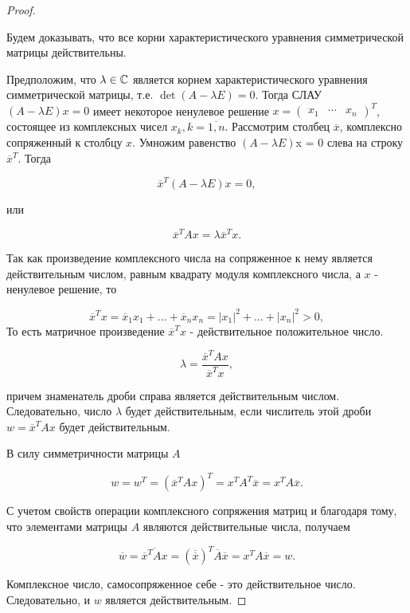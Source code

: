 \begin{proof}~

    Будем доказывать, что все корни характеристического уравнения симметрической матрицы действительны.

    Предположим, что $\lambda \in \mathbb{C}$ является корнем характеристического уравнения симметрической матрицы, т.е. $\det (A - \lambda E) = 0$. Тогда СЛАУ $(A - \lambda E)x = 0$ имеет некоторое ненулевое решение $x = \begin{pmatrix} x_1 & \cdots & x_n \end{pmatrix} ^ T$, состоящее из комплексных чисел $x_k, k = \overline{1, n}$. Рассмотрим столбец $\overline{x}$, комплексно сопряженный к столбцу $x$. Умножим равенство $(A - \lambda E)$x = 0 слева на строку $\overline{x}^T$. Тогда

    $$\overline{x}^T(A - \lambda E)x = 0,$$

    или

    $$\overline{x}^TAx = \lambda \overline{x}^Tx.$$

    Так как произведение комплексного числа на сопряженное к нему является действительным числом, равным квадрату модуля комплексного числа, а $x$ - ненулевое решение, то
    
    $$\overline{x}^Tx = \overline{x}_1x_1 + \ldots + \overline{x}_nx_n = |x_1|^2 + \ldots + |x_n|^2 > 0,$$
    То есть матричное произведение $\overline{x}^Tx$ - действительное положительное число.

    $$\lambda = \frac{\overline{x}^TAx}{\overline{x}^Tx},$$

    причем знаменатель дроби справа является действительным числом. Следовательно, число $\lambda$ будет действительным, если числитель этой дроби $w = \overline{x}^TAx$ будет действительным.

    В силу симметричности матрицы $A$

    $$w = w^T = (\overline{x}^TAx)^T = x^TA^T\overline{x} = x^TA\overline{x}.$$

    С учетом свойств операции комплексного сопряжения матриц и благодаря тому, что элементами матрицы $A$ являются действительные числа, получаем

    $$\overline{w} = \overline{\overline{x}^TAx} = (\overline{\overline{x}})^T\overline{A}\overline{x} = x^TA\overline{x} = w.$$

    Комплексное число, самосопряженное себе - это действительное число. Следовательно, и $w$ является действительным.
\end{proof}

